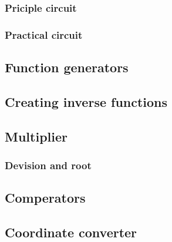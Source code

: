 \documentclass[letterpaper,10pt,english]{sphinxmanual}
\begin{document}
\subsubsection{Priciple circuit}
\label{\detokenize{rst/computing_elements/integrator:priciple-circuit}}

\subsubsection{Practical circuit}
\label{\detokenize{rst/computing_elements/integrator:practical-circuit}}

\subsection{Function generators}
\label{\detokenize{rst/computing_elements/function_generators:function-generators}}\label{\detokenize{rst/computing_elements/function_generators::doc}}

\subsection{Creating inverse functions}
\label{\detokenize{rst/computing_elements/inverse_functions:creating-inverse-functions}}\label{\detokenize{rst/computing_elements/inverse_functions::doc}}

\subsection{Multiplier}
\label{\detokenize{rst/computing_elements/multiplier:multiplier}}\label{\detokenize{rst/computing_elements/multiplier::doc}}

\subsubsection{Devision and root}
\label{\detokenize{rst/computing_elements/multiplier:devision-and-root}}

\subsection{Comperators}
\label{\detokenize{rst/computing_elements/comperators:comperators}}\label{\detokenize{rst/computing_elements/comperators::doc}}

\subsection{Coordinate converter}
\label{\detokenize{rst/computing_elements/coordinate_converter:coordinate-converter}}\label{\detokenize{rst/computing_elements/coordinate_converter::doc}}
\end{document}
